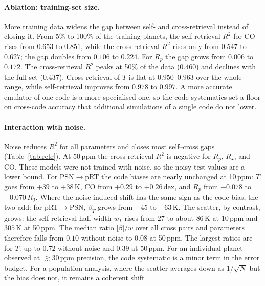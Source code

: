 \paragraph{Ablation: training-set size.}
More training data widens the gap between self- and cross-retrieval instead of closing it.
From 5\% to 100\% of the training planets, the self-retrieval $R^2$ for CO rises from $0.653$ to $0.851$, while the cross-retrieval $R^2$ rises only from $0.547$ to $0.627$; the gap doubles from $0.106$ to $0.224$.
For $R_p$ the gap grows from $0.006$ to $0.172$.
The cross-retrieval $R^2$ peaks at 50\% of the data ($0.460$) and declines with the full set ($0.437$).
Cross-retrieval of $T$ is flat at $0.950$--$0.963$ over the whole range, while self-retrieval improves from $0.978$ to $0.997$.
A more accurate emulator of one code is a more specialised one, so the code systematics set a floor on cross-code accuracy that additional simulations of a single code do not lower.

\paragraph{Interaction with noise.}
Noise reduces $R^2$ for all parameters and closes most self--cross gaps (Table~\ref{tab:retr}).
At 50\,ppm the cross-retrieval $R^2$ is negative for $R_p$, $R_\star$, and CO.
These models were not trained with noise, so the noisy-test values are a lower bound.
For PSN$\rightarrow$pRT the code biases are nearly unchanged at 10\,ppm: $T$ goes from $+39$ to $+38\,\mathrm{K}$, CO from $+0.29$ to $+0.26\,\mathrm{dex}$, and $R_p$ from $-0.078$ to $-0.070\,R_{\mathrm J}$.
Where the noise-induced shift has the same sign as the code bias, the two add: for pRT$\rightarrow$PSN, $\beta_T$ grows from $-45$ to $-63\,\mathrm{K}$.
The scatter, by contrast, grows: the self-retrieval half-width $w_T$ rises from $27$ to about $86\,\mathrm{K}$ at 10\,ppm and $305\,\mathrm{K}$ at 50\,ppm.
The median ratio $|\beta|/w$ over all cross pairs and parameters therefore falls from $0.10$ without noise to $0.08$ at 50\,ppm.
The largest ratios are for $T$: up to $0.72$ without noise and $0.39$ at 50\,ppm.
For an individual planet observed at $\gtrsim30\,\mathrm{ppm}$ precision, the code systematic is a minor term in the error budget.
For a population analysis, where the scatter averages down as $1/\sqrt{N}$ but the bias does not, it remains a coherent shift~\cite{TODO_population_level_retrieval_biases}.

